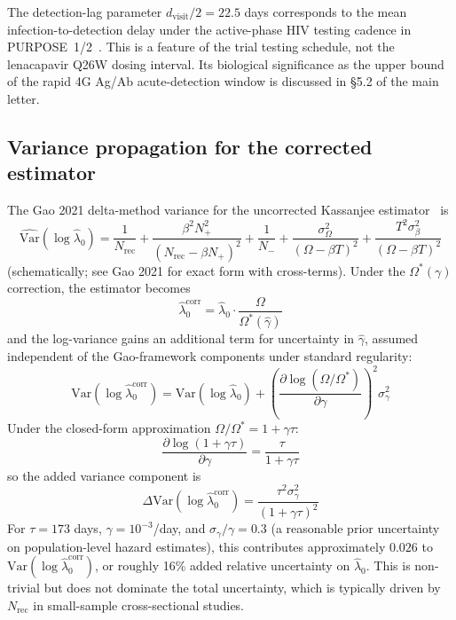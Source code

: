 \documentclass[11pt]{article}
\begin{document}
The detection-lag parameter $d_{\mathrm{visit}}/2 = 22.5$ days corresponds to the mean infection-to-detection delay under the active-phase HIV testing cadence in PURPOSE~1/2~\cite{bekker2024,kelley2025}. This is a feature of the trial testing schedule, not the lenacapavir Q26W dosing interval. Its biological significance as the upper bound of the rapid 4G Ag/Ab acute-detection window is discussed in §5.2 of the main letter.

\subsection{Variance propagation for the corrected estimator}

The Gao 2021 delta-method variance for the uncorrected Kassanjee estimator~\cite{gao2021} is
\begin{equation}
\widehat{\mathrm{Var}}(\log \hat\lambda_0) = \frac{1}{N_{\mathrm{rec}}} + \frac{\beta^2 N_+^2}{(N_{\mathrm{rec}} - \beta N_+)^2} + \frac{1}{N_-} + \frac{\sigma_\Omega^2}{(\Omega-\beta T)^2} + \frac{T^2 \sigma_\beta^2}{(\Omega-\beta T)^2}
\end{equation}
(schematically; see Gao 2021 for exact form with cross-terms). Under the $\Omega^*(\gamma)$ correction, the estimator becomes
\begin{equation}
\hat\lambda_0^{\mathrm{corr}} = \hat\lambda_0 \cdot \frac{\Omega}{\Omega^*(\hat\gamma)}
\end{equation}
and the log-variance gains an additional term for uncertainty in $\hat\gamma$, assumed independent of the Gao-framework components under standard regularity:
\begin{equation}
\mathrm{Var}(\log \hat\lambda_0^{\mathrm{corr}}) = \mathrm{Var}(\log \hat\lambda_0) + \left(\frac{\partial \log(\Omega/\Omega^*)}{\partial \gamma}\right)^2 \sigma_\gamma^2
\end{equation}
Under the closed-form approximation $\Omega/\Omega^* = 1 + \gamma\tau$:
\begin{equation}
\frac{\partial \log(1 + \gamma\tau)}{\partial \gamma} = \frac{\tau}{1 + \gamma\tau}
\end{equation}
so the added variance component is
\begin{equation}
\Delta\mathrm{Var}(\log \hat\lambda_0^{\mathrm{corr}}) = \frac{\tau^2 \sigma_\gamma^2}{(1 + \gamma\tau)^2} \label{eq:added_var}
\end{equation}
For $\tau = 173$ days, $\gamma = 10^{-3}$/day, and $\sigma_\gamma / \gamma = 0.3$ (a reasonable prior uncertainty on population-level hazard estimates), this contributes approximately $0.026$ to $\mathrm{Var}(\log \hat\lambda_0^{\mathrm{corr}})$, or roughly 16\% added relative uncertainty on $\hat\lambda_0$. This is non-trivial but does not dominate the total uncertainty, which is typically driven by $N_{\mathrm{rec}}$ in small-sample cross-sectional studies.
\end{document}
